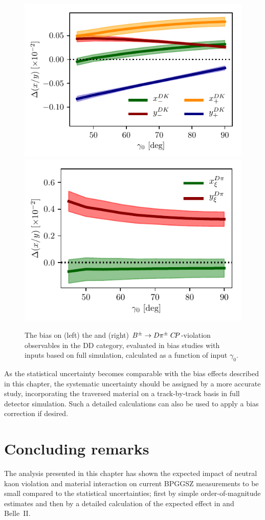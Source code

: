 \begin{figure}[tb]
  \centering
  \includegraphics[width=0.45\columnwidth]{figures/ks_chapter/delta_xy_dk.pdf}
  \includegraphics[width=0.45\columnwidth]{figures/ks_chapter/delta_xy_dpi.pdf}
  \caption{The bias on (left) the \BtoDK and (right) ${{{B}^\pm}\rightarrow{\ensuremath{D}}{\ensuremath{{\pi}^\pm}}} \;{C\!P}$-violation observables in the \lhcb DD category, evaluated in bias studies with inputs based on full \lhcb simulation, calculated as a function of input $\gamma_0$.}
  \label{fig:LHCb_related_biases}
\end{figure}

As the statistical uncertainty becomes comparable with the bias effects described in this chapter, the systematic uncertainty should be assigned by a more accurate study, incorporating the traversed material on a track-by-track basis in full detector simulation. Such a detailed calculations can also be used to apply a bias correction if desired. 


\section{Concluding remarks} %
\label{sec:concluding_remarks}



The analysis presented in this chapter has shown the expected impact of neutral kaon \CP violation and material interaction on current BPGGSZ measurements to be small compared to the statistical uncertainties; first by simple order-of-magnitude estimates and then by a detailed calculation of the expected effect in \lhcb and Belle~II.



